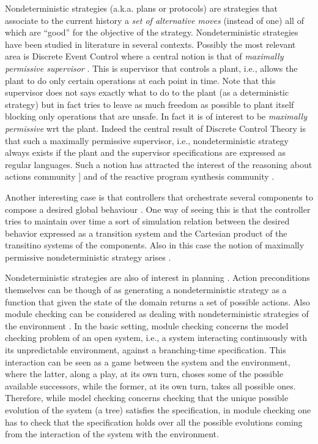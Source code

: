 Nondeterministic strategies (a.k.a. plans or protocols) are strategies
that associate to the current history a \emph{set of alternative
  moves} (instead of one) all of which are ``good'' for the objective
of the strategy.
Nondeterministic strategies have been studied in literature in several
contexts.
Possibly the most relevant area is Discrete Event Control where a
central notion is that of \emph{maximally permissive supervisor}
\cite{WonhamRamadge:SIAMJCO87,Cassandras:BOOK06_DES,Wo14}. This is
supervisor that controls a plant, i.e., allows the plant to do only
certain operations at each point in time. Note that this supervisor
does not says exactly what to do to the plant (as a deterministic
strategy) but in fact tries to leave as much freedom as possible to
plant itself blocking only operations that are unsafe. In fact it is
of interest to be \emph{maximally permissive} wrt the plant. 
Indeed the central result of Discrete Control Theory is that such a
maximally permissive supervisor, i.e., nondeterministic strategy
always exists if the plant and the supervisor specifications are
expressed as regular languages. Such a notion has attracted the interest
of the reasoning about actions community
]\cite{DeGiacomoLM12,BanihashemiGL-AAMAS18} and of the reactive program
synthesis community \cite{pnueli1989synthesisshort,EhlersLTV17}.


Another interesting case is that controllers that orchestrate several components to compose a desired global behaviour \cite{DePS13,DeGiacomoVFAL18}. One way of seeing this is that the controller tries to maintain over time a sort of simulation relation between the desired behavior expressed as a transition system and the Cartesian product of the transitino systems of the components. Also in this case the notion of maximally permissive nondeterministic strategy arises \cite{DePS13}.


Nondeterministic strategies are also of interest in planning \cite{GeffnerBo13}. 
Action preconditions themselves can be though of as generating a nondeterministic strategy 
as a function that given the state of the domain returns a set of possible actions. 
Also module checking can be considered as dealing with nondeterministic strategies
of the environment \cite{kupferman1997module,jamroga2014module}. 
In the basic setting, module checking concerns the model checking problem of an open system, 
i.e., a system interacting continuously with its unpredictable environment, 
against a branching-time specification. 
This interaction can be seen as a game between the system and the environment, 
where the latter, along a play, at its own turn, choses some of the possible available successors, 
while the former, at its own turn, takes all possible ones. 
Therefore, while model checking concerns checking that 
the unique possible evolution of the system (a tree) satisfies the specification, 
in module checking one has to check that the specification holds 
over all the possible evolutions coming from the interaction of the system with the environment.

